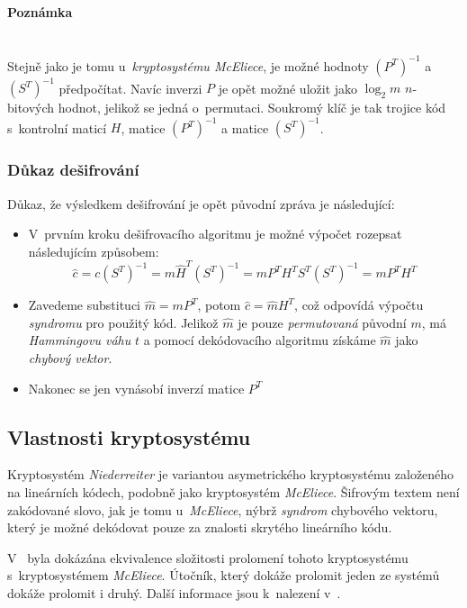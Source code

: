 \documentclass[thesis=M,czech,hidelinks]{FITthesis}[2012/06/26]
\newcommand{\0}{{\textcolor[gray]{0.80}{0}}}
\begin{document}
\paragraph{Poznámka} \hfil \\
Stejně jako je tomu u~\emph{kryptosystému McEliece}, je možné hodnoty
$\left(P^T\right)^{-1}$ a $\left(S^T\right)^{-1}$ předpočítat. Navíc inverzi
$P$ je opět možné uložit jako $\log_2 m$ $n$-bitových hodnot, jelikož se jedná
o~permutaci. Soukromý klíč je tak trojice kód s~kontrolní maticí $H$,
matice $\left(P^T\right)^{-1}$ a matice $\left(S^T\right)^{-1}$.


\subsubsection{Důkaz dešifrování}
Důkaz, že výsledkem dešifrování je opět původní zpráva je následující:

\begin{itemize}
    \item V~prvním kroku dešifrovacího algoritmu je možné výpočet rozepsat
        následujícím způsobem:
    $$ \hat{c} =   c \left(S^T\right)^{-1} =
                    m \hat{H}^T \left(S^T\right)^{-1} =
                    m P^T H^T S^T \left(S^T\right)^{-1} =
                    m P^T H^T
    $$
    \item Zavedeme substituci $\hat{m} = m P^T$, potom $\hat{c} = \hat{m} H^T$,
        což odpovídá výpočtu \emph{syndromu} pro použitý kód. Jelikož $\hat{m}$
        je pouze \emph{permutovaná} původní $m$, má \emph{Hammingovu váhu} $t$
        a pomocí dekódovacího algoritmu získáme $\hat{m}$ jako \emph{chybový
        vektor}.
    \item Nakonec se jen vynásobí inverzí matice $P^T$

\end{itemize}

\subsection{Vlastnosti kryptosystému}
Kryptosystém \emph{Niederreiter} je variantou asymetrického kryptosystému
založeného na lineárních kódech, podobně jako kryptosystém
\emph{McEliece}. Šifrovým textem není zakódované slovo, jak je tomu
u~\emph{McEliece}, nýbrž \emph{syndrom} chybového vektoru, který je možné
dekódovat pouze za znalosti skrytého lineárního kódu.

V~\cite{XingLi} byla dokázána ekvivalence složitosti prolomení tohoto
kryptosystému s~kryptosystémem \emph{McEliece}. Útočník, který dokáže prolomit
jeden ze systémů dokáže prolomit i druhý. Další informace jsou k~nalezení
v~\cite{Niederreiter,Courtois}.
\end{document}
